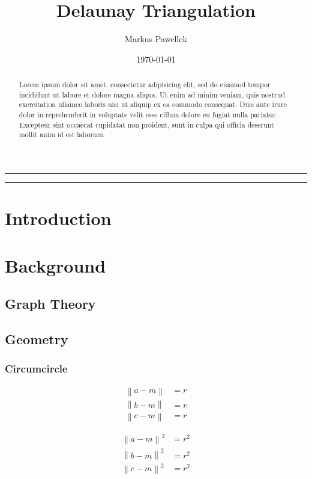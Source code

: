 \documentclass[10pt, twoside, fleqn]{article}
\title{Delaunay Triangulation}
\author{Markus Pawellek}
\date{\today}
\let\oldsection\section
\renewcommand*\section{%
  \cleardoublepage
  \thispagestyle{sectionstyle}\oldsection}
\let\oldpagenumbering\pagenumbering
\renewcommand*\pagenumbering[1]{%
  \cleardoublepage
  \oldpagenumbering{#1}}
\newcommand{\norm}[1]{\left\| #1 \right\|}
\begin{document}
  \maketitle
  \thispagestyle{empty}

  \bigskip
  \hrule
  \medskip
  \begin{abstract}
    Lorem ipsum dolor sit amet, consectetur adipisicing elit, sed do eiusmod
    tempor incididunt ut labore et dolore magna aliqua. Ut enim ad minim veniam,
    quis nostrud exercitation ullamco laboris nisi ut aliquip ex ea commodo
    consequat. Duis aute irure dolor in reprehenderit in voluptate velit esse
    cillum dolore eu fugiat nulla pariatur. Excepteur sint occaecat cupidatat non
    proident, sunt in culpa qui officia deserunt mollit anim id est laborum.
  \end{abstract}
  \medskip
  \hrule
  \bigskip

  \tableofcontents

  \section{Introduction}
  \section{Background}
    \subsection{Graph Theory}
    \subsection{Geometry}
      \subsubsection{Circumcircle}

        \begin{align*}
          \norm{a - m} &= r \\
          \norm{b - m} &= r \\
          \norm{c - m} &= r
        \end{align*}

        \begin{align*}
          \norm{a - m}^2 &= r^2 \\
          \norm{b - m}^2 &= r^2 \\
          \norm{c - m}^2 &= r^2
        \end{align*}
\end{document}
